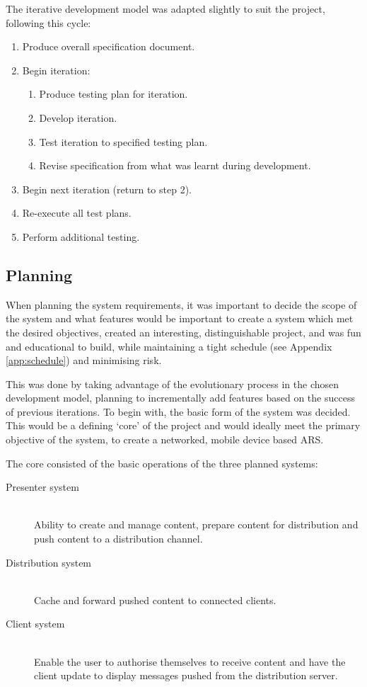\documentclass[a4papert,11pt,notitlepage]{article}
\begin{document}
The iterative development model was adapted slightly to suit the project, following this cycle:
\begin{enumerate}
\item Produce overall specification document.
\item Begin iteration:
\begin{enumerate}
\item Produce testing plan for iteration.
\item Develop iteration.
\item Test iteration to specified testing plan.
\item Revise specification from what was learnt during development.
\end{enumerate}
\item Begin next iteration (return to step 2).
\item Re-execute all test plans.
\item Perform additional testing.
\end{enumerate}

\subsection{Planning}
When planning the system requirements, it was important to decide the scope of the system and what features would be important to create a system which met the desired objectives, created an interesting, distinguishable project, and was fun and educational to build, while maintaining a tight schedule (see Appendix \ref{app:schedule}) and minimising risk.

This was done by taking advantage of the evolutionary process in the chosen development model, planning to incrementally add features based on the success of previous iterations. To begin with, the basic form of the system was decided. This would be a defining `core' of the project and would ideally meet the primary objective of the system, to create a networked, mobile device based ARS.

The core consisted of the basic operations of the three planned systems:
\begin{description}
\item[Presenter system] \hfill \\
Ability to create and manage content, prepare content for distribution and push content to a distribution channel.
\item[Distribution system] \hfill \\
Cache and forward pushed content to connected clients.
\item[Client system] \hfill \\
Enable the user to authorise themselves to receive content and have the client update to display messages pushed from the distribution server.
\end{description}
\end{document}
